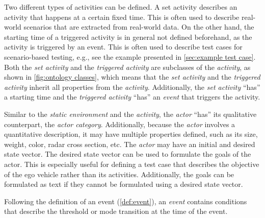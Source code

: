 Two different types of activities can be defined. A set activity describes an activity that happens at a certain fixed time. This is often used to describe real-world scenarios that are extracted from real-world data. On the other hand, the starting time of a triggered activity is in general not defined beforehand, as the activity is triggered by an event. This is often used to describe test cases for scenario-based testing, e.g., see the example presented in \cref{sec:example test case}. 
Both the \textit{set activity} and the \textit{triggered activity} are subclasses of the \textit{activity}, as shown in \cref{fig:ontology classes}, which means that the \textit{set activity} and the \textit{triggered activity} inherit all properties from the \textit{activity}. Additionally, the \textit{set activity} ``has'' a starting time and the \textit{triggered activity} ``has'' an \textit{event} that triggers the activity.

Similar to the \textit{static environment} and the \textit{activity}, the \textit{actor} ``has'' its qualitative counterpart, the \textit{actor category}. Additionally, because the \textit{actor} involves a quantitative description, it may have multiple properties defined, such as its size, weight, color, radar cross section, etc. The \textit{actor} may have an initial and desired state vector. The desired state vector can be used to formulate the goals of the actor. This is especially useful for defining a test case that describes the objective of the ego vehicle rather than its activities. Additionally, the goals can be formulated as text if they cannot be formulated using a desired state vector.


Following the definition of an event (\cref{def:event}), an \textit{event} contains conditions that describe the threshold or mode transition at the time of the event.


